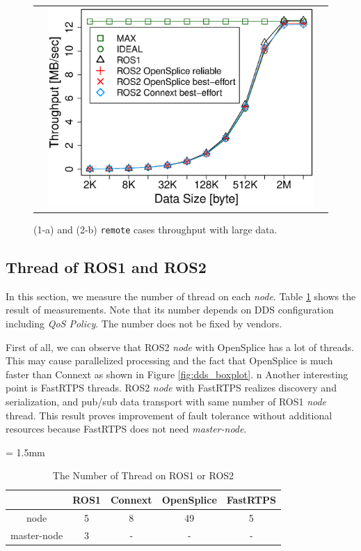 \documentclass{sig-alternate-05-2015}
\begin{document}
\begin{figure}[t]
\begin{tabular}{ccc}
    &
    \begin{minipage}[t]{0.31\textwidth}
      \includegraphics[width=1.0\linewidth]{../figure/throughput_remote_large-data.eps}
      \caption{(1-a) and (2-b) \texttt{remote} cases throughput with large data.}
      \label{fig:throughput_large}
    \end{minipage}
  \end{tabular}
\end{figure}


\subsection{Thread of ROS1 and ROS2}
\label{sec:throughput}
In this section, we measure the number of thread on each \emph{node}.
Table \ref{tb:thread} shows the result of measurements.
Note that its number depends on DDS configuration including \emph{QoS Policy}.
The number does not be fixed by vendors.

First of all, we can observe that ROS2 \emph{node} with OpenSplice has a lot of threads.
This may cause parallelized processing and the fact that OpenSplice is much faster than Connext as shown in Figure \ref{fig:dds_boxplot}.
n
Another interesting point is FastRTPS threads.
ROS2 \emph{node} with FastRTPS realizes discovery and serialization, and pub/sub data transport with same number of ROS1 \emph{node} thread.
This result proves improvement of fault tolerance without additional resources because FastRTPS does not need \emph{master-node}.
\begin{table}[t]
\caption{\label{tb:thread}The Number of Thread on ROS1 or ROS2}
\centering
\tabcolsep = 1.5mm              %
\begin{tabular}{c|cccc}
\hline
 & ROS1 & Connext & OpenSplice & FastRTPS \\
\hline
\hline
node & 5 & 8 & 49 & 5 \\
master-node & 3 & - & - & - \\
\hline
\end{tabular}
\end{table}
\end{document}
